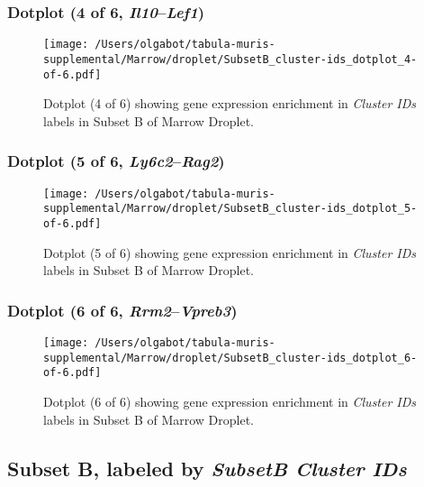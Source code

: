 \clearpage

\subsubsection{Dotplot (4 of 6, \emph{Il10}--\emph{Lef1})}
\begin{figure}[h]
\centering
\texttt{[image: /Users/olgabot/tabula-muris-supplemental/Marrow/droplet/SubsetB\_cluster-ids\_dotplot\_4-of-6.pdf]}

\caption{ Dotplot (4 of 6)  showing gene expression enrichment in \emph{Cluster IDs} labels in Subset B of Marrow Droplet. }
\end{figure}


\clearpage

\subsubsection{Dotplot (5 of 6, \emph{Ly6c2}--\emph{Rag2})}
\begin{figure}[h]
\centering
\texttt{[image: /Users/olgabot/tabula-muris-supplemental/Marrow/droplet/SubsetB\_cluster-ids\_dotplot\_5-of-6.pdf]}

\caption{ Dotplot (5 of 6)  showing gene expression enrichment in \emph{Cluster IDs} labels in Subset B of Marrow Droplet. }
\end{figure}


\clearpage

\subsubsection{Dotplot (6 of 6, \emph{Rrm2}--\emph{Vpreb3})}
\begin{figure}[h]
\centering
\texttt{[image: /Users/olgabot/tabula-muris-supplemental/Marrow/droplet/SubsetB\_cluster-ids\_dotplot\_6-of-6.pdf]}

\caption{ Dotplot (6 of 6)  showing gene expression enrichment in \emph{Cluster IDs} labels in Subset B of Marrow Droplet. }
\end{figure}


\clearpage

\subsection{Subset B, labeled by \emph{SubsetB Cluster IDs}}
